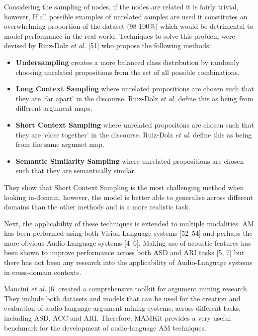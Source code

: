 \documentclass[twocolumn]{article}
\providecommand{\tightlist}{%
  \setlength{\itemsep}{0pt}\setlength{\parskip}{0pt}}
\begin{document}
Considering the sampling of nodes, if the nodes are related it is fairly
trivial, however, If all possible examples of unrelated samples are used
it constitutes an overwhelming proportion of the dataset (98-100\%) which
would be detrimental to model performance in the real world. Techniques
to solve this problem were devised by Ruiz-Dolz \emph{et al.} {[}51{]} who
propose the following methods:

\begin{itemize}
\tightlist
\item
  \textbf{Undersampling} creates a more balanced class distribution by
  randomly choosing unrelated propositions from the set of all possible
  combinations.
\item
  \textbf{Long Context Sampling} where unrelated propositions are chosen
  such that they are `far apart' in the discourse. Ruiz-Dolz \emph{et
  al.} define this as being from different argument maps.
\item
  \textbf{Short Context Sampling} where unrelated propositons are chosen
  such that they are `close together' in the discourse. Ruiz-Dolz
  \emph{et al.} define this as being from the same argumet map.
\item
  \textbf{Semantic Similarity Sampling} where unrelated propositions are
  chosen such that they are semantically similar.
\end{itemize}

They show that Short Context Sampling is the most challenging method
when looking in-domain, however, the model is better able to generalise
across different domains than the other methods and is a more realistic
task.

Next, the applicability of these techniques is extended to multiple
modalities. AM has been performed using both Vision-Language systems
{[}52--54{]} and perhaps the more obvious Audio-Language systems
{[}4--6{]}. Making use of acoustic features has been shown to
improve performance across both ASD and ARI tasks {[}5, 7{]} but
there has not been any research into the applicability of Audio-Language
systems in cross-domain contexts.

Mancini \emph{et al.} {[}6{]} created a comprehensive toolkit for
argument mining research. They include both datasets and models that can
be used for the creation and evaluation of audio-language argument
mining systems, across different tasks, including ASD, ACC and ARI.
Therefore, MAMKit provides a very useful benchmark for the development
of audio-language AM techniques.
\end{document}
